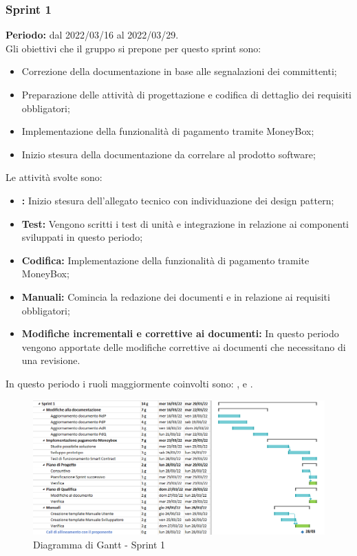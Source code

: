 \subsubsection{Sprint 1} \label{subsubsection:sprint_1}
\textbf{Periodo:} dal 2022/03/16 al 2022/03/29.
\bigskip
\\Gli obiettivi che il gruppo si prepone per questo sprint\glo{} sono:
\begin{itemize}
  \item Correzione della documentazione in base alle segnalazioni dei committenti;
  \item Preparazione delle attività di progettazione e codifica di dettaglio dei requisiti obbligatori;
  \item Implementazione della funzionalità di pagamento tramite MoneyBox\glo{};
  \item Inizio stesura della documentazione da correlare al prodotto software;
\end{itemize}
Le attività svolte sono:
\begin{itemize}
  \item \textbf{\PB{}:} Inizio stesura dell’allegato tecnico con individuazione dei design pattern;
  \item \textbf{Test:} Vengono scritti i test di unità e integrazione in relazione ai componenti sviluppati in questo periodo;
  \item \textbf{Codifica:} Implementazione della funzionalità di pagamento tramite MoneyBox\glo{};
  \item \textbf{Manuali:} Comincia la redazione dei documenti \docNameVersionMU{} e \docNameVersionMS{} in relazione ai requisiti obbligatori;
  \item \textbf{Modifiche incrementali e correttive ai documenti:} In questo periodo vengono apportate delle modifiche correttive ai documenti che necessitano di una revisione.
\end{itemize}
In questo periodo i ruoli maggiormente coinvolti sono: \roleDesignerLow{}, \roleProgrammerLow{} e \roleVerifierLow{}.
\bigskip
\begin{figure}[H]
  \centering
  \includegraphics[scale=0.55]{immagini/1sprint.png}
  \caption{Diagramma di Gantt - Sprint 1}
\end{figure}

